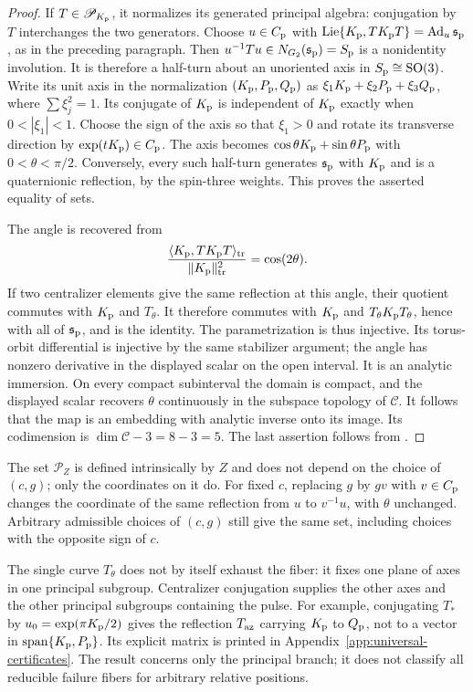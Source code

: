 \documentclass[11pt,a4paper]{article}
\newcommand{\SO}{\mathrm{SO}}
\newcommand{\Lie}{\operatorname{Lie}}
\newcommand{\Ad}{\operatorname{Ad}}
\newcommand{\Span}{\operatorname{span}}
\begin{document}
\begin{proof}
If $T\in\mathscr P_{K_{\rm p}}$, it normalizes its generated principal algebra: conjugation by $T$ interchanges the two generators.
Choose $u\in C_{\rm p}$ with $\Lie\{K_{\rm p},TK_{\rm p}T\}=\Ad_u\mathfrak s_{\rm p}$, as in the preceding paragraph.
Then $u^{-1}Tu\in N_{G_2}(\mathfrak s_{\rm p})=S_{\rm p}$ is a nonidentity involution.
It is therefore a half-turn about an unoriented axis in $S_{\rm p}\cong\SO(3)$.  Write its unit axis in the normalization $(K_{\rm p},P_{\rm p},Q_{\rm p})$ as
$\xi_1K_{\rm p}+\xi_2P_{\rm p}+\xi_3Q_{\rm p}$, where $\sum\xi_j^2=1$.
Its conjugate of $K_{\rm p}$ is independent of $K_{\rm p}$ exactly when $0<|\xi_1|<1$.
Choose the sign of the axis so that $\xi_1>0$ and rotate its transverse direction by $\exp(tK_{\rm p})\in C_{\rm p}$.
The axis becomes $\cos\theta K_{\rm p}+\sin\theta P_{\rm p}$ with $0<\theta<\pi/2$.
Conversely, every such half-turn generates $\mathfrak s_{\rm p}$ with $K_{\rm p}$ and is a quaternionic reflection, by the spin-three weights.
This proves the asserted equality of sets.

The angle is recovered from
\[
\frac{\langle K_{\rm p},TK_{\rm p}T\rangle_{\rm tr}}{\|K_{\rm p}\|_{\rm tr}^2}=\cos(2\theta).
\]
If two centralizer elements give the same reflection at this angle, their quotient commutes with $K_{\rm p}$ and $T_\theta$.
It therefore commutes with $K_{\rm p}$ and $T_\theta K_{\rm p}T_\theta$, hence with all of $\mathfrak s_{\rm p}$, and is the identity.
The parametrization is thus injective.  Its torus-orbit differential is injective by the same stabilizer argument; the angle has nonzero derivative in the displayed scalar on the open interval.
It is an analytic immersion.  On every compact subinterval the domain is compact, and the displayed scalar recovers $\theta$ continuously in the subspace topology of $\mathscr C$.  It follows that the map is an embedding with analytic inverse onto its image.  Its codimension is $\dim\mathscr C-3=8-3=5$.
The last assertion follows from .
\end{proof}

The set $\mathscr P_Z$ is defined intrinsically by $Z$ and does not depend on the choice of $(c,g)$; only the coordinates on it do.
For fixed $c$, replacing $g$ by $gv$ with $v\in C_{\rm p}$ changes the coordinate of the same reflection from $u$ to $v^{-1}u$, with $\theta$ unchanged.
Arbitrary admissible choices of $(c,g)$ still give the same set, including choices with the opposite sign of $c$.

The single curve $T_\theta$ does not by itself exhaust the fiber: it fixes one plane of axes in one principal subgroup.  Centralizer conjugation supplies the other axes and the other principal subgroups containing the pulse.
For example, conjugating $T_*$ by $u_0=\exp(\pi K_{\rm p}/2)$ gives the reflection $T_{\rm az}$ carrying $K_{\rm p}$ to $Q_{\rm p}$, not to a vector in $\Span\{K_{\rm p},P_{\rm p}\}$.  Its explicit matrix is printed in Appendix~\ref{app:universal-certificates}.
The result concerns only the principal branch; it does not classify all reducible failure fibers for arbitrary relative positions.
\end{document}
